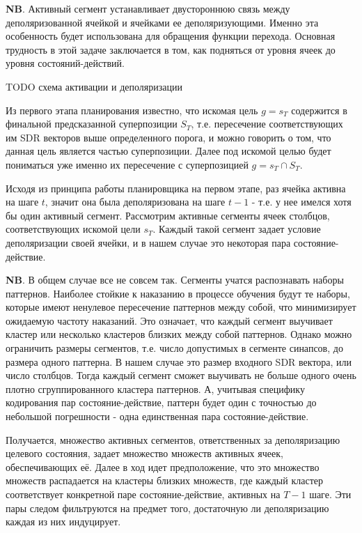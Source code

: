 \documentclass[a4paper]{article}
\begin{document}
\textbf{NB}. Активный сегмент устанавливает двустороннюю связь между деполяризованной ячейкой и ячейками ее деполяризующими. Именно эта особенность будет использована для обращения функции перехода. Основная трудность в этой задаче заключается в том, как подняться от уровня ячеек до уровня состояний-действий.

TODO схема активации и деполяризации

Из первого этапа планирования известно, что искомая цель $g = s_T$ содержится в финальной предсказанной суперпозиции $S_T$, т.е. пересечение соответствующих им SDR векторов выше определенного порога, и можно говорить о том, что данная цель является частью суперпозиции. Далее под искомой целью будет пониматься уже именно их пересечение с суперпозицией $g = s_T \cap S_T$.

Исходя из принципа работы планировщика на первом этапе, раз ячейка активна на шаге $t$, значит она была деполяризована на шаге $t-1$ - т.е. у нее имелся хотя бы один активный сегмент. Рассмотрим активные сегменты ячеек столбцов, соответствующих искомой цели $s_T$. Каждый такой сегмент задает условие деполяризации своей ячейки, и в нашем случае это некоторая пара состояние-действие.

\begin{framed}
  \textbf{NB}. В общем случае все не совсем так. Сегменты учатся распознавать наборы паттернов. Наиболее стойкие к наказанию в процессе обучения будут те наборы, которые имеют ненулевое пересечение паттернов между собой, что минимизирует ожидаемую частоту наказаний. Это означает, что каждый сегмент выучивает кластер или несколько кластеров близких между собой паттернов. Однако можно ограничить размеры сегментов, т.е. число допустимых в сегменте синапсов, до размера одного паттерна. В нашем случае это размер входного SDR вектора, или число столбцов. Тогда каждый сегмент сможет выучивать не больше одного очень плотно сгруппированного кластера паттернов. А, учитывая специфику кодирования пар состояние-действие, паттерн будет один с точностью до небольшой погрешности - одна единственная пара состояние-действие.
\end{framed}

Получается, множество активных сегментов, ответственных за деполяризацию целевого состояния, задает множество множеств активных ячеек, обеспечивающих её. Далее в ход идет предположение, что это множество множеств распадается на кластеры близких множеств, где каждый кластер соответствует конкретной паре состояние-действие, активных на $T-1$ шаге. Эти пары следом фильтруются на предмет того, достаточную ли деполяризацию каждая из них индуцирует.
\end{document}
